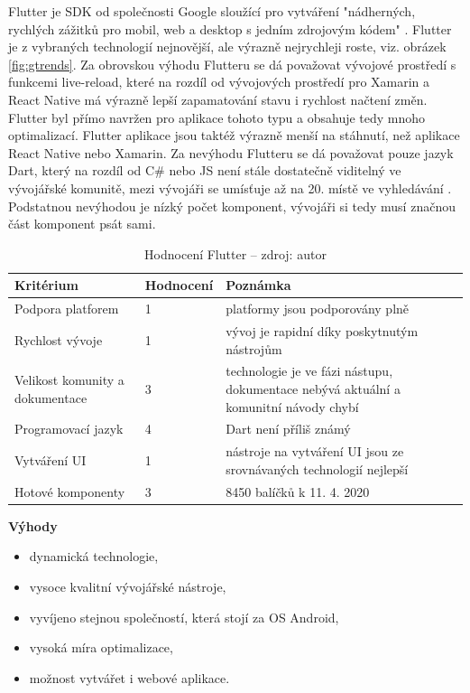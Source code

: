 Flutter je SDK od společnosti Google sloužící pro vytváření "nádherných, rychlých zážitků pro mobil, web a desktop s jedním zdrojovým kódem" \cite{flutter}. Flutter je z vybraných technologií nejnovější, ale výrazně nejrychleji roste, viz. obrázek \ref{fig:gtrends}. Za obrovskou výhodu Flutteru se dá považovat vývojové prostředí s funkcemi live-reload, které na rozdíl od vývojových prostředí pro Xamarin a React Native má výrazně lepší zapamatování stavu i rychlost načtení změn. Flutter byl přímo navržen pro aplikace tohoto typu a obsahuje tedy mnoho optimalizací. Flutter aplikace jsou taktéž výrazně menší na stáhnutí, než aplikace React Native nebo Xamarin. Za nevýhodu Flutteru se dá považovat pouze jazyk Dart, který na rozdíl od C\# nebo JS není stále dostatečně viditelný ve vývojářské komunitě, mezi vývojáři se umísťuje až na 20. místě ve vyhledávání \cite{novick2017react}. Podstatnou nevýhodou je nízký počet komponent, vývojáři si tedy musí značnou část komponent psát sami.

\begin{table}[h]
	\begin{tabularx}{\textwidth}{| X | X | X |}
		\hline
		Kritérium                       & Hodnocení & Poznámka \\
		\hline
		Podpora platforem               & 1 & platformy jsou podporovány plně          \\
		\hline
		Rychlost vývoje                 & 1 & vývoj je rapidní díky poskytnutým nástrojům         \\
		\hline
		Velikost komunity a dokumentace & 3 & technologie je ve fázi nástupu, dokumentace nebývá aktuální a komunitní návody chybí         \\
		\hline
		Programovací jazyk              & 4 & Dart není příliš známý \\
		\hline
		Vytváření UI                    & 1 & nástroje na vytváření UI jsou ze srovnávaných technologií nejlepší \\
		\hline
		Hotové komponenty               & 3 & 8450 balíčků k 11. 4. 2020 \\
		\hline    
	\end{tabularx}
	\caption[Hodnocení Flutter]{Hodnocení Flutter -- zdroj: autor}
\end{table}

\textbf{Výhody}
\begin{itemize}
	\item dynamická technologie,
	\item vysoce kvalitní vývojářské nástroje,
	\item vyvíjeno stejnou společností, která stojí za OS Android,
	\item vysoká míra optimalizace,
	\item možnost vytvářet i webové aplikace.
\end{itemize}

